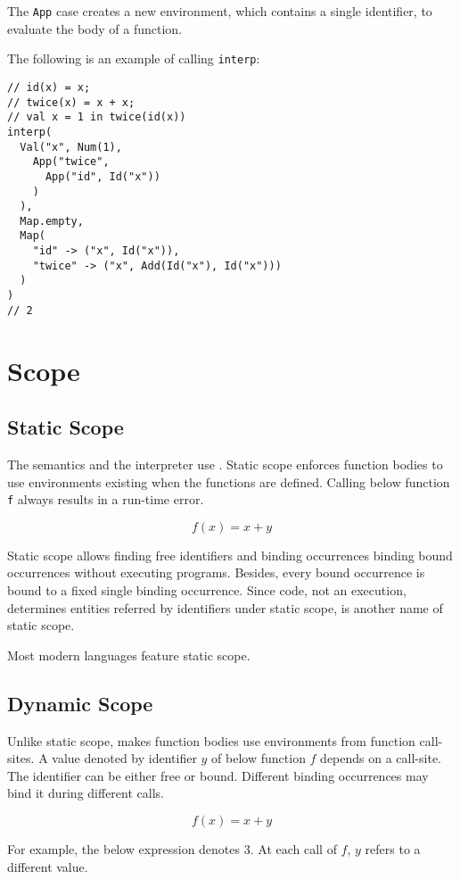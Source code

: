 The \verb!App! case creates a new environment, which contains a single
identifier, to evaluate the body of a function.

The following is an example of calling \verb!interp!:

\begin{verbatim}
// id(x) = x;
// twice(x) = x + x;
// val x = 1 in twice(id(x))
interp(
  Val("x", Num(1),
    App("twice",
      App("id", Id("x"))
    )
  ),
  Map.empty,
  Map(
    "id" -> ("x", Id("x")),
    "twice" -> ("x", Add(Id("x"), Id("x")))
  )
)
// 2
\end{verbatim}

\section{Scope}

\subsection{Static Scope}

The semantics and the interpreter use . Static scope enforces
function bodies to use environments existing when the functions are defined.
Calling below function \verb!f! always results in a run-time error.

\[f(x)=x+y\]

Static scope allows finding free identifiers and binding occurrences binding
bound occurrences without executing programs. Besides, every bound occurrence is
bound to a fixed single binding occurrence. Since code, not an execution,
determines entities referred by identifiers under static scope,  is another name of static scope.

Most modern languages feature static scope.

\subsection{Dynamic Scope}

Unlike static scope,  makes function bodies use environments
from function call-sites. A value denoted by identifier \(y\) of below function
\(f\) depends on a call-site. The identifier can be either free or bound.
Different binding occurrences may bind it during different calls.

\[f(x)=x+y\]

For example, the below expression denotes \(3\). At each call of \(f\), \(y\)
refers to a different value.

